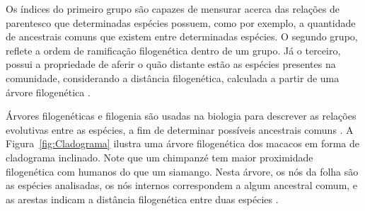 Os índices do primeiro grupo são capazes de mensurar acerca das relações de parentesco que determinadas espécies possuem, como por exemplo, a quantidade de ancestrais comuns que existem entre determinadas espécies. O segundo grupo, reflete a ordem de ramificação filogenética dentro de um grupo. Já o terceiro, possui a propriedade de aferir o quão distante estão as espécies presentes na comunidade, considerando a distância filogenética, calculada a partir de uma árvore filogenética \cite{carvalho2016metodos}.



Árvores filogenéticas e filogenia são usadas na biologia para descrever as relações evolutivas entre as espécies, a fim de determinar possíveis ancestrais comuns \cite{baxevanis2004bioinformatics}. A Figura~\ref{fig:Cladograma} ilustra uma árvore filogenética dos macacos em forma de cladograma inclinado. Note que um chimpanzé tem maior proximidade filogenética com humanos do que um siamango. Nesta árvore, os nós da folha são as espécies analisadas, os nós internos correspondem a algum ancestral comum, e as arestas indicam a distância filogenética entre duas espécies \cite{carvalho2016metodos, baxevanis2004bioinformatics}.


